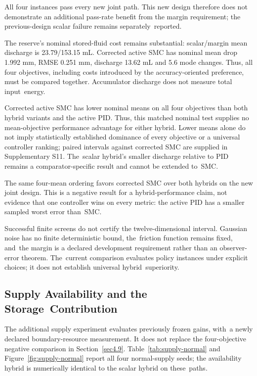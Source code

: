 \documentclass[machines,article,submit,pdftex,moreauthors]{Definitions/mdpi}
\begin{document}
All four instances pass every new joint path. This new design therefore does not demonstrate an additional pass-rate benefit from the margin requirement; the previous-design scalar failure remains separately~reported.

The reserve's nominal stored-fluid cost remains substantial: scalar/margin mean discharge is 23.79/153.15 mL. Corrected active SMC has nominal mean drop 1.992 mm, RMSE 0.251 mm, discharge 13.62 mL and 5.6 mode changes. Thus, all four objectives, including costs introduced by the accuracy-oriented preference, must be compared together. Accumulator discharge does not measure total input~energy.

Corrected active SMC has lower nominal means on all four objectives than both hybrid variants and the active PID. Thus, this matched nominal test supplies no mean-objective performance advantage for either hybrid. Lower means alone do not imply statistically established dominance of every objective or a universal controller ranking; paired intervals against corrected SMC are supplied in Supplementary S11. The~scalar hybrid's smaller discharge relative to PID remains a comparator-specific result and cannot be extended to~SMC.

The same four-mean ordering favors corrected SMC over both hybrids on the new joint design. This is a negative result for a hybrid-performance claim, not evidence that one controller wins on every metric: the active PID has a smaller sampled worst error than~SMC.

Successful finite screens do not certify the twelve-dimensional interval. Gaussian noise has no finite deterministic bound, the~friction function remains fixed, and~the margin is a declared development requirement rather than an observer-error theorem. The~current comparison evaluates policy instances under explicit choices; it does not establish universal hybrid~superiority.





\subsection{Supply Availability and the Storage~Contribution}\label{sec:supply-results}
\label{sec4.10}

The additional supply experiment evaluates previously frozen gains, with~a newly declared boundary-resource measurement. It does not replace the four-objective negative comparison in Section~\ref{sec4.9}. Table~\ref{tab:supply-normal} and Figure~\ref{fig:supply-normal} report all four normal-supply seeds; the availability hybrid is numerically identical to the scalar hybrid on these~paths.
\end{document}

